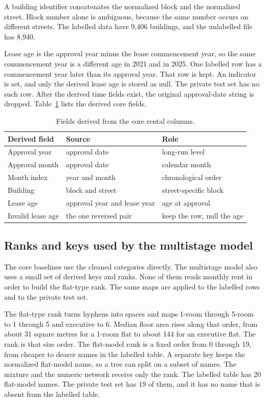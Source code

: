 \documentclass[11pt,a4paper]{article}
\begin{document}
A building identifier concatenates the normalized block and the normalized street.
Block number alone is ambiguous, because the same number occurs on different streets.
The labelled data have 9{,}406 buildings, and the unlabelled file has 8{,}940.

Lease age is the approval year minus the lease commencement year, so the same commencement year is a different age in 2021 and in 2025.
One labelled row has a commencement year later than its approval year.
That row is kept.
An indicator is set, and only the derived lease age is stored as null.
The private test set has no such row.
After the derived time fields exist, the original approval-date string is dropped.
Table~\ref{tab:derived-core-features} lists the derived core fields.

\begin{table}[htbp]
\centering
\caption{Fields derived from the core rental columns.}
\label{tab:derived-core-features}
\small
\begin{tabular}{lll}
\toprule
Derived field & Source & Role \\
\midrule
Approval year & approval date & long-run level \\
Approval month & approval date & calendar month \\
Month index & year and month & chronological order \\
Building & block and street & street-specific block \\
Lease age & approval year and lease year & age at approval \\
Invalid lease age & the one reversed pair & keep the row, null the age \\
\bottomrule
\end{tabular}
\end{table}

\subsection{Ranks and keys used by the multistage model}
\label{sec:ranks}

The core baselines use the cleaned categories directly.
The multistage model also uses a small set of derived keys and ranks.
None of them reads monthly rent in order to build the flat-type rank.
The same maps are applied to the labelled rows and to the private test set.

The flat-type rank turns hyphens into spaces and maps 1-room through 5-room to 1 through 5 and executive to 6.
Median floor area rises along that order, from about 31 square metres for a 1-room flat to about 144 for an executive flat.
The rank is that size order.
The flat-model rank is a fixed order from 0 through 19, from cheaper to dearer names in the labelled table.
A separate key keeps the normalized flat-model name, so a tree can split on a subset of names.
The mixture and the numeric network receive only the rank.
The labelled table has 20 flat-model names.
The private test set has 19 of them, and it has no name that is absent from the labelled table.
\end{document}
